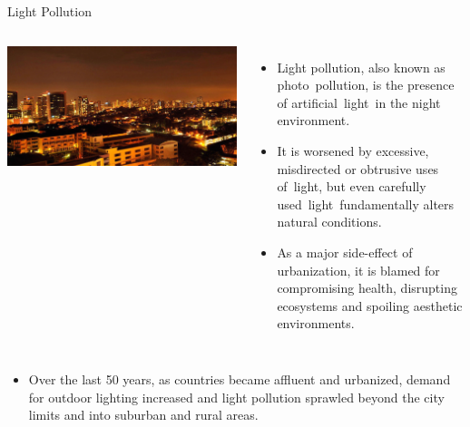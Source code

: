 \documentclass{beamer}
\begin{document}
     \begin{frame}{Light Pollution}
        \begin{columns}
                \includegraphics[height=.99\textwidth,width=.99\textwidth]{img/light-pollution.jpg}
            \begin{itemize}
                \item Light pollution, also known as photo pollution, is the presence of artificial light in the 
            night environment.
                \item It is worsened by excessive, misdirected or obtrusive uses of light, but even 
            carefully used light fundamentally alters natural conditions.
            \item
              As a major side-effect of urbanization, 
            it is blamed for compromising health, disrupting ecosystems and spoiling aesthetic environments.
            \end{itemize}
        \end{columns}
     \end{frame}
     
     \begin{frame}
        \begin{itemize}
            \item Over the last 50 years, as countries became affluent and urbanized, demand for outdoor
             lighting increased and light pollution sprawled beyond the city limits and into suburban and
              rural areas.

        \end{itemize}
     \end{frame}
\end{document}
